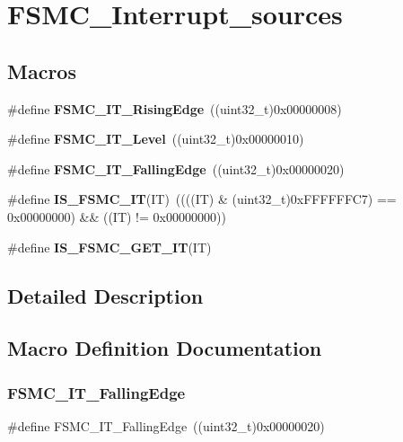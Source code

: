 \section{F\+S\+M\+C\+\_\+\+Interrupt\+\_\+sources}
\label{group__FSMC__Interrupt__sources}
\subsection*{Macros}
\begin{DoxyCompactItemize}
\item 
\#define \textbf{ F\+S\+M\+C\+\_\+\+I\+T\+\_\+\+Rising\+Edge}~((uint32\+\_\+t)0x00000008)
\item 
\#define \textbf{ F\+S\+M\+C\+\_\+\+I\+T\+\_\+\+Level}~((uint32\+\_\+t)0x00000010)
\item 
\#define \textbf{ F\+S\+M\+C\+\_\+\+I\+T\+\_\+\+Falling\+Edge}~((uint32\+\_\+t)0x00000020)
\item 
\#define \textbf{ I\+S\+\_\+\+F\+S\+M\+C\+\_\+\+IT}(IT)~((((IT) \& (uint32\+\_\+t)0x\+F\+F\+F\+F\+F\+F\+C7) == 0x00000000) \&\& ((\+I\+T) != 0x00000000))
\item 
\#define \textbf{ I\+S\+\_\+\+F\+S\+M\+C\+\_\+\+G\+E\+T\+\_\+\+IT}(IT)
\end{DoxyCompactItemize}


\subsection{Detailed Description}


\subsection{Macro Definition Documentation}
\mbox{\label{group__FSMC__Interrupt__sources_ga8e4b9589c9981c900b5f2e84581a9693}} 
\subsubsection{F\+S\+M\+C\+\_\+\+I\+T\+\_\+\+Falling\+Edge}
{\footnotesize\ttfamily \#define F\+S\+M\+C\+\_\+\+I\+T\+\_\+\+Falling\+Edge~((uint32\+\_\+t)0x00000020)}




